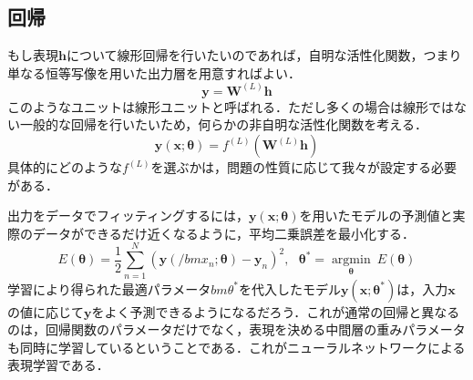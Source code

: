 \documentclass[a4paper,11pt]{jsreport}
\begin{document}
\subsection*{回帰}
もし表現$\bm{h}$について線形回帰を行いたいのであれば，自明な活性化関数，つまり単なる恒等写像を用いた出力層を用意すればよい．
\begin{equation}
  \bm{y}
  = \bm{W}^{(L)} \bm{h}
\end{equation}
このようなユニットは線形ユニットと呼ばれる．ただし多くの場合は線形ではない一般的な回帰を行いたいため，何らかの非自明な活性化関数を考える．
\begin{equation}
  \bm{y}(\bm{x}; \bm{\theta})
  = f^{(L)}\left( \bm{W}^{(L)} \bm{h} \right)
\end{equation}
具体的にどのような$f^{(L)}$を選ぶかは，問題の性質に応じて我々が設定する必要がある．\par
出力をデータでフィッティングするには，$\bm{y}(\bm{x}; \bm{\theta})$を用いたモデルの予測値と実際のデータができるだけ近くなるように，平均二乗誤差を最小化する．
\begin{equation}
  E(\bm{\theta})
  = \frac{1}{2} \sum_{n=1}^N \left( \bm{y}(/bm{x}_n; \bm{\theta}) - \bm{y}_n \right)^2, \ \ \
  \bm{\theta}^* = \underset{\bm{\theta}} {\operatorname{argmin}} \ E(\bm{\theta})
\end{equation}
学習により得られた最適パラメータ$bm{\theta}^*$を代入したモデル$\bm{y}(\bm{x}; \bm{\theta}^*)$は，入力$\bm{x}$の値に応じて$\bm{y}$をよく予測できるようになるだろう．これが通常の回帰と異なるのは，回帰関数のパラメータだけでなく，表現を決める中間層の重みパラメータも同時に学習しているということである．これがニューラルネットワークによる表現学習である．
\end{document}

